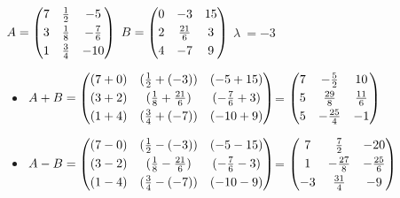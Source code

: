 \documentclass{report}
\begin{document}
\begin{enumerate}
\vspace{.5cm}
$A=\begin{pmatrix}\vspace{.1cm} 7 & \frac{1}{2} & -5\\\vspace{.1cm} 3 & \frac{1}{8} & -\frac{7}{6}\\ 1 & \frac{3}{4} & -10 \end{pmatrix}$\qquad 
$B=\begin{pmatrix}\vspace{.1cm} 0 & -3 & 15\\\vspace{.1cm} 2 & \frac{21}{6} & 3\\ 4 & -7 & 9 \end{pmatrix}$\qquad
$\lambda\  = -3$
\begin{itemize}
\item $A+B=\begin{pmatrix}\vspace{.1cm} (7+0) & (\frac{1}{2}+(-3)) & (-5+15)\\\vspace{.1cm} (3+2) & (\frac{1}{8}+\frac{21}{6}) & (-\frac{7}{6}+3)\\ (1+4) & (\frac{3}{4}+(-7)) & (-10+9) \end{pmatrix}$\qquad =
$\begin{pmatrix}\vspace{.1cm} 7 & -\frac{5}{2} & 10\\\vspace{.1cm} 5 & \frac{29}{8} & \frac{11}{6}\\ 5 & -\frac{25}{4} & -1 \end{pmatrix}$
\vspace{.3cm}
\item $A-B=\begin{pmatrix}\vspace{.1cm} (7-0) & (\frac{1}{2}-(-3)) & (-5-15)\\\vspace{.1cm} (3-2) & (\frac{1}{8}-\frac{21}{6}) & (-\frac{7}{6}-3)\\ (1-4) & (\frac{3}{4}-(-7)) & (-10-9) \end{pmatrix}$\qquad =
$\begin{pmatrix}\vspace{.1cm} 7 & \frac{7}{2} & -20\\\vspace{.1cm} 1 & -\frac{27}{8} & -\frac{25}{6}\\ -3 & \frac{31}{4} & -9 \end{pmatrix}$

\end{itemize}
\end{enumerate}
\end{document}
